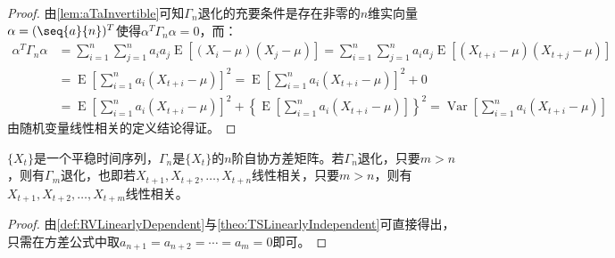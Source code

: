 \begin{proof}
	由\cref{lem:aTaInvertible}可知$\Gamma_n$退化的充要条件是存在非零的$n$维实向量$\alpha=(\seq{a}{n})^T$使得$\alpha^T\Gamma_n\alpha=0$，而：
	\begin{align*}
		\alpha^T\Gamma_n\alpha
		&=\sum_{i=1}^{n}\sum_{j=1}^{n}a_ia_j\operatorname{E}[(X_i-\mu)(X_j-\mu)] =\sum_{i=1}^{n}\sum_{j=1}^{n}a_ia_j\operatorname{E}[(X_{t+i}-\mu)(X_{t+j}-\mu)] \\
		&=\operatorname{E}\left[\sum_{i=1}^{n}a_i(X_{t+i}-\mu)\right]^2 =\operatorname{E}\left[\sum_{i=1}^{n}a_i(X_{t+i}-\mu)\right]^2+0 \\
		&=\operatorname{E}\left[\sum_{i=1}^{n}a_i(X_{t+i}-\mu)\right]^2+\left\{\operatorname{E}\left[\sum_{i=1}^{n}a_i(X_{t+i}-\mu)\right]\right\}^2 =\operatorname{Var}\left[\sum_{i=1}^{n}a_i(X_{t+i}-\mu)\right]
	\end{align*}
	由随机变量线性相关的定义结论得证。
\end{proof}
\begin{theorem}
	$\{X_t\}$是一个平稳时间序列，$\Gamma_n$是$\{X_t\}$的$n$阶自协方差矩阵。若$\Gamma_n$退化，只要$m>n$，则有$\Gamma_m$退化，也即若$X_{t+1},X_{t+2},\dots,X_{t+n}$线性相关，只要$m>n$，则有$X_{t+1},X_{t+2},\dots,X_{t+m}$线性相关。
\end{theorem}
\begin{proof}
	由\cref{def:RVLinearlyDependent}与\cref{theo:TSLinearlyIndependent}可直接得出，只需在方差公式中取$a_{n+1}=a_{n+2}=\cdots=a_{m}=0$即可。
\end{proof}
